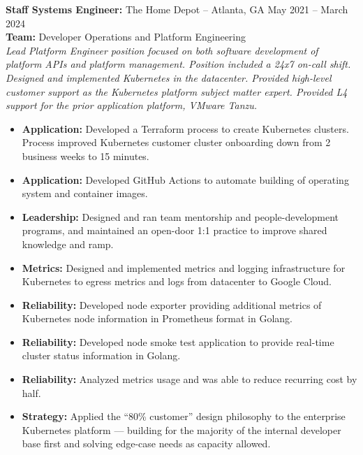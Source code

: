 \documentclass[11pt]{article}
\begin{document}
\begin{description}
\item\textbf{Staff Systems Engineer:} {The Home Depot} -- Atlanta, GA \hfill May 2021 -- March 2024 \\
\textbf{Team:} Developer Operations and Platform Engineering \\
\textit{Lead Platform Engineer position focused on both software development of platform APIs and platform management. Position included a 24x7 on-call shift. Designed and implemented Kubernetes in the datacenter. Provided high-level customer support as the Kubernetes platform subject matter expert. Provided L4 support for the prior application platform, VMware Tanzu.} \\
\vspace{-6.5pt}
\begin{itemize}
  \item \textbf{Application:} Developed a Terraform process to create Kubernetes clusters. Process improved Kubernetes customer cluster onboarding down from 2 business weeks to 15 minutes.
  \item \textbf{Application:} Developed GitHub Actions to automate building of operating system and container images.
  \item \textbf{Leadership:} Designed and ran team mentorship and people-development programs, and maintained an open-door 1:1 practice to improve shared knowledge and ramp.
  \item \textbf{Metrics:} Designed and implemented metrics and logging infrastructure for Kubernetes to egress metrics and logs from datacenter to Google Cloud.
  \item \textbf{Reliability:} Developed node exporter providing additional metrics of Kubernetes node information in Prometheus format in Golang.
  \item \textbf{Reliability:} Developed node smoke test application to provide real-time cluster status information in Golang.
  \item \textbf{Reliability:} Analyzed metrics usage and was able to reduce recurring cost by half.
  \item \textbf{Strategy:} Applied the ``80\% customer'' design philosophy to the enterprise Kubernetes platform — building for the majority of the internal developer base first and solving edge-case needs as capacity allowed.
\end{itemize}
\end{description}
\end{document}
